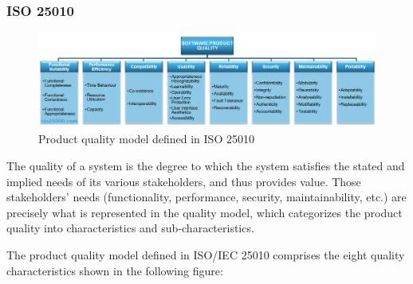 \subsubsection{ISO 25010}

\begin{figure}[H]
    \centering
    \includegraphics[width=1\textwidth]{images/iso25010.png}
    \caption{Product quality model defined in ISO 25010}
    \label{productquality model}
\end{figure}

The quality of a system is the degree to which the system satisfies the stated and implied needs of
its various stakeholders, and thus provides value. Those stakeholders' needs (functionality,
performance, security, maintainability, etc.) are precisely what is represented in the quality model,
which categorizes the product quality into characteristics and sub-characteristics.

The product quality model defined in ISO/IEC 25010 comprises the eight quality characteristics
shown in the following figure:

